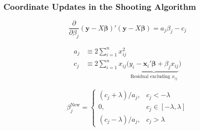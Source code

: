 \begin{frame}
  \frametitle{Coordinate Updates in the Shooting Algorithm}

\[
\frac{\partial}{\partial \beta_j} \left( \mathbf{y} - X \boldsymbol{\beta} \right)'\left( \mathbf{y} - X \boldsymbol{\beta} \right) = a_j \beta_j - c_j
\]

\vspace{-1em}

  \begin{align*}
    a_j &\equiv 2\sum_{i=1}^n x_{ij}^2\\
    c_j &\equiv 2\sum_{i=1}^n x_{ij}\big(\underbrace{y_i - \mathbf{x}_i'\boldsymbol{\beta} + \beta_j x_{ij}}_{\text{Residual excluding } x_{ij}}\big)
  \end{align*}

  \[
    \beta_j^{\text{New}} = \left\{
    \begin{array}{rl}
      (c_j + \lambda)/a_j, & c_j < -\lambda\\
      0, & c_j \in [-\lambda, \lambda]\\
      (c_j - \lambda)/a_j, & c_j > \lambda
    \end{array}
  \right.
  \]
\end{frame}
